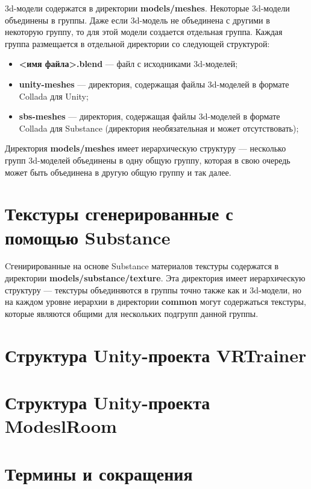 3d-модели содержатся в директории \textbf{models/meshes}. Некоторые 3d-модели объединены в группы. Даже если 3d-модель не объединена с другими в некоторую группу, то для этой модели создается отдельная группа. Каждая группа размещается в отдельной директории со следующей структурой: 


\begin{itemize}
	\item \textbf{<имя файла>.blend} --- файл с исходниками 3d-моделей;
	\item \todom\textbf{unity-meshes} --- директория, содержащая файлы 3d-моделей в формате Collada для Unity;
	\item \textbf{sbs-meshes} --- директория, содержащая файлы 3d-моделей в формате Collada для Substance (директория необязательная и может отсутствовать);
\end{itemize}

Директория \textbf{models/meshes} имеет иерархическую структуру --- несколько групп 3d-моделей объединены в одну общую группу, которая в свою очередь может быть объединена в другую общую группу и так далее. 


\section{Текстуры сгенерированные с помощью Substance}

Cгенирированные на основе Substance материалов текстуры содержатся в директории \textbf{models/substance/texture}. Эта директория имеет иерархическую структуру --- текстуры объединяются в группы точно также как и 3d-модели, но на каждом уровне иерархии в директории \todom\textbf{common} могут содержаться текстуры, которые являются общими для нескольких подгрупп данной группы.


\section{Структура Unity-проекта VRTrainer}

\section{Структура Unity-проекта ModeslRoom}

\section{Термины и сокращения}







